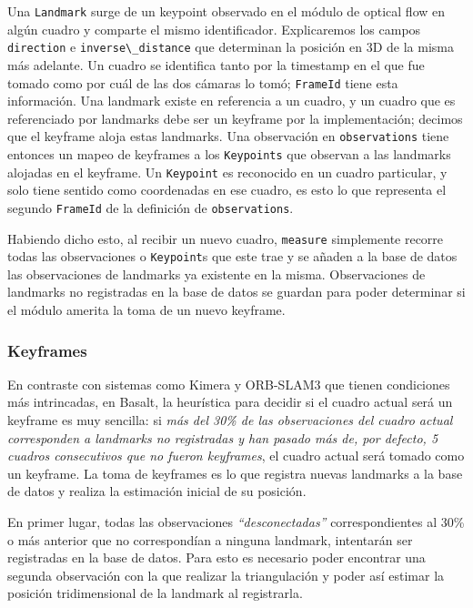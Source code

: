 \documentclass[ twoside,openright,titlepage,numbers=noenddot,%
                headinclude,footinclude,cleardoublepage=empty,abstract=on,
                BCOR=-5mm,paper=a4,fontsize=11pt
                ]{scrreprt}
\newcommand{\passthrough}[1]{#1}
\begin{document}
Una \passthrough{\lstinline!Landmark!} surge de un keypoint observado en
el módulo de optical flow en algún cuadro y comparte el mismo
identificador. Explicaremos los campos
\passthrough{\lstinline!direction!} e
\passthrough{\lstinline!inverse\_distance!} que determinan la posición
en 3D de la misma más adelante. Un cuadro se identifica tanto por la
timestamp en el que fue tomado como por cuál de las dos cámaras lo tomó;
\passthrough{\lstinline!FrameId!} tiene esta información. Una landmark
existe en referencia a un cuadro, y un cuadro que es referenciado por
landmarks debe ser un keyframe por la implementación; decimos que el
keyframe aloja estas landmarks. Una observación en
\passthrough{\lstinline!observations!} tiene entonces un mapeo de
keyframes a los \passthrough{\lstinline!Keypoints!} que observan a las
landmarks alojadas en el keyframe. Un \passthrough{\lstinline!Keypoint!}
es reconocido en un cuadro particular, y solo tiene sentido como
coordenadas en ese cuadro, es esto lo que representa el segundo
\passthrough{\lstinline!FrameId!} de la definición de
\passthrough{\lstinline!observations!}.

Habiendo dicho esto, al recibir un nuevo cuadro,
\passthrough{\lstinline!measure!} simplemente recorre todas las
observaciones o \passthrough{\lstinline!Keypoint!}s que este trae y se
añaden a la base de datos las observaciones de landmarks ya existente en
la misma. Observaciones de landmarks no registradas en la base de datos
se guardan para poder determinar si el módulo amerita la toma de un
nuevo keyframe.

\hypertarget{keyframes}{%
\subsubsection{Keyframes}\label{keyframes}}

En contraste con sistemas como Kimera y ORB-SLAM3 que tienen condiciones
más intrincadas, en Basalt, la heurística para decidir si el cuadro
actual será un keyframe es muy sencilla: si \emph{más del 30\% de las
observaciones del cuadro actual corresponden a landmarks no registradas
y han pasado más de, por defecto, 5 cuadros consecutivos que no fueron
keyframes}, el cuadro actual será tomado como un keyframe. La toma de
keyframes es lo que registra nuevas landmarks a la base de datos y
realiza la estimación inicial de su posición.

En primer lugar, todas las observaciones \emph{``desconectadas''}
correspondientes al 30\% o más anterior que no correspondían a ninguna
landmark, intentarán ser registradas en la base de datos. Para esto es
necesario poder encontrar una segunda observación con la que realizar la
triangulación y poder así estimar la posición tridimensional de la
landmark al registrarla.
\end{document}
